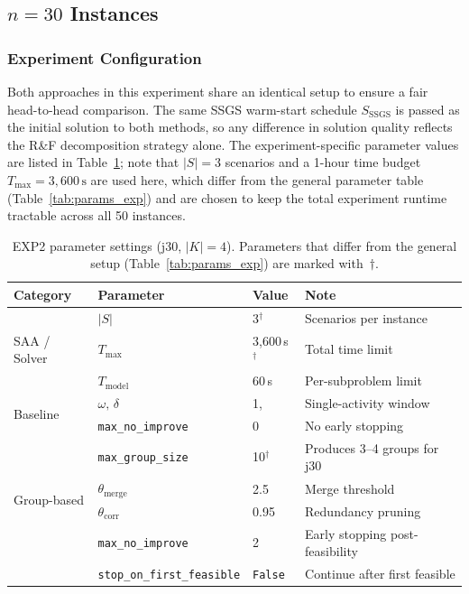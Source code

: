 \subsection{$n=30$ Instances}
\label{subsec:n30_results}

\subsubsection*{Experiment Configuration}

Both approaches in this experiment share an identical setup to
ensure a fair head-to-head comparison. The same SSGS warm-start
schedule $S_{\mathrm{SSGS}}$ is passed as the initial solution
to both methods, so any difference in solution quality reflects
the R\&F decomposition strategy alone. The experiment-specific
parameter values are listed in Table~\ref{tab:exp2_params};
note that $|S|=3$ scenarios and a 1-hour time budget
$T_{\max} = 3{,}600\,\text{s}$ are used here, which differ
from the general parameter table (Table~\ref{tab:params_exp})
and are chosen to keep the total experiment runtime tractable
across all 50 instances.

\begin{table}[ht]
\centering
\renewcommand{\arraystretch}{1.35}
\caption{EXP2 parameter settings (j30, $|K|=4$).
         Parameters that differ from the general setup
         (Table~\ref{tab:params_exp}) are marked with~$\dagger$.}
\label{tab:exp2_params}
\begin{tabular}{llll}
\hline
\textbf{Category} & \textbf{Parameter} & \textbf{Value} & \textbf{Note} \\
\hline
\multirow{3}{*}{SAA / Solver}
    & $|S|$                        & 3$^\dagger$     & Scenarios per instance \\
    & $T_{\max}$                   & 3{,}600\,s$^\dagger$ & Total time limit \\
    & $T_{\mathrm{model}}$         & 60\,s           & Per-subproblem limit \\
\hline
\multirow{2}{*}{Baseline}
    & $\omega,\,\delta$            & 1,\;0           & Single-activity window \\
    & \texttt{max\_no\_improve}    & 0               & No early stopping \\
\hline
\multirow{4}{*}{Group-based}
    & \texttt{max\_group\_size}    & 10$^\dagger$    & Produces 3--4 groups for j30 \\
    & $\theta_{\mathrm{merge}}$    & 2.5             & Merge threshold \\
    & $\theta_{\mathrm{corr}}$     & 0.95            & Redundancy pruning \\
    & \texttt{max\_no\_improve}    & 2               & Early stopping post-feasibility \\
    & \texttt{stop\_on\_first\_feasible} & \texttt{False} & Continue after first feasible \\
\hline
\end{tabular}
\end{table}

